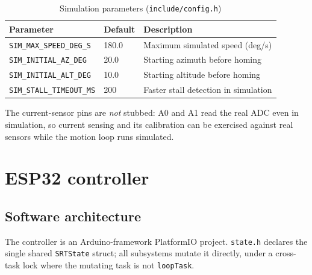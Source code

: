 \documentclass[11pt,a4paper]{article}
\begin{document}
\begin{table}[H]
\centering
\caption{Simulation parameters (\texttt{include/config.h})}
\begin{tabular}{lll}
\toprule
\textbf{Parameter} & \textbf{Default} & \textbf{Description} \\
\midrule
\texttt{SIM\_MAX\_SPEED\_DEG\_S} & 180.0 & Maximum simulated speed (deg/s) \\
\texttt{SIM\_INITIAL\_AZ\_DEG} & 20.0 & Starting azimuth before homing \\
\texttt{SIM\_INITIAL\_ALT\_DEG} & 10.0 & Starting altitude before homing \\
\texttt{SIM\_STALL\_TIMEOUT\_MS} & 200 & Faster stall detection in simulation \\
\bottomrule
\end{tabular}
\end{table}

The current-sensor pins are \emph{not} stubbed: A0 and A1 read the real ADC even in simulation, so current sensing and its calibration can be exercised against real sensors while the motion loop runs simulated.

\section{ESP32 controller}
\label{sec:esp32}

\subsection{Software architecture}

The controller is an Arduino-framework PlatformIO project. \texttt{state.h} declares the single shared \texttt{SRTState} struct; all subsystems mutate it directly, under a cross-task lock where the mutating task is not \texttt{loopTask}.
\end{document}
